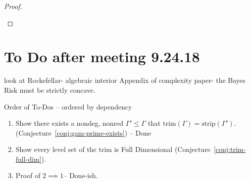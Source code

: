 \documentclass[12pt]{article}
\newcommand{\Comments}{1}
\newcommand{\mynote}[2]{\ifnum\Comments=1\textcolor{#1}{#2}\fi}
\newcommand{\jessie}[1]{\mynote{purple}{[JF: #1]}}
\newcommand{\R}{\mathcal{R}}
\newcommand{\inter}[1]{\mathring{#1}}%
\newcommand{\trim}{\mathrm{trim}}
\newcommand{\strip}{\text{strip}}
\begin{document}
\begin{proof}
\begin{enumerate}
%
%
%


\end{enumerate} 

\end{proof}

\section{To Do after meeting 9.24.18}



look at Rockefellar- algebraic interior
Appendix of complexity paper- the Bayes Risk must be strictly concave.


Order of To-Dos -- ordered by dependency
\begin{enumerate}
\item Show there exists a nondeg, nonred $\Gamma' \leq \Gamma$ that $\trim(\Gamma) = \strip(\Gamma')$. (Conjecture~\ref{conj:gam-prime-exists}) -- Done
\item Show every level set of the trim is Full Dimensional (Conjecture~\ref{conj:trim-full-dim}).
\item Proof of $2 \implies 1$-- Done-ish.
\end{enumerate}
\end{document}
